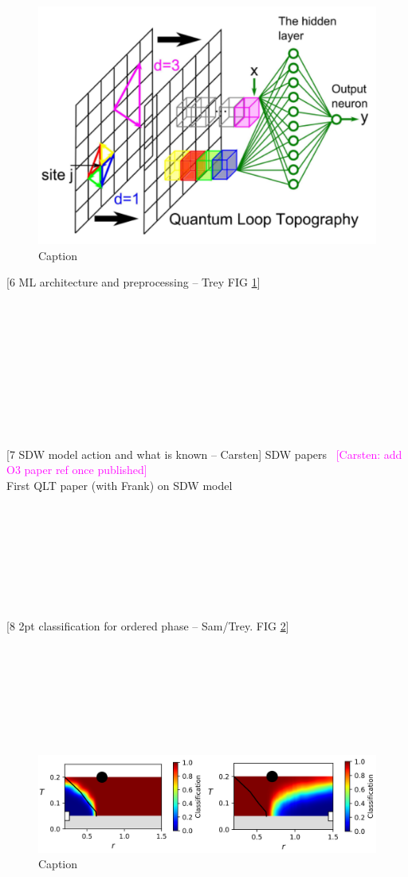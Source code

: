 \documentclass[amsmath,amssymb, aps, prx, longbibliography, twocolumn]{revtex4-1}
\newcommand{\cb}[1]{\textcolor{magenta}{[Carsten: #1]}}
\begin{document}
 \begin{figure} [t]
    \centering
\includegraphics[width=.5\textwidth]{qlt.png}
    \caption{Caption}
    \label{fig:qlt}
\end{figure}
[6 ML architecture and preprocessing -- Trey FIG \ref{fig:qlt}]
\\
\\
\\
\\
\\
\\
\\
\\
\\
\\
\\


[7 SDW model action and what is known -- Carsten]
SDW papers~\cite{Berg2012, Schattner2016, Gerlach2017, Liu2018} \cb{add O3 paper ref once published}
\\
First QLT paper (with Frank) on SDW model~\cite{Zhang2019}
\\
\\
\\
\\
\\
\\
\\
\\
\\

[8 2pt classification for ordered phase -- Sam/Trey. FIG \ref{fig:2ptsdw}]
\\
\\
\\
\\
\\
\\
\\
\\
 \begin{figure} [t]
    \centering
\includegraphics[width=.45\textwidth]{2PT-SDW.png}
    \caption{Caption}
    \label{fig:2ptsdw}
\end{figure}
\end{document}
